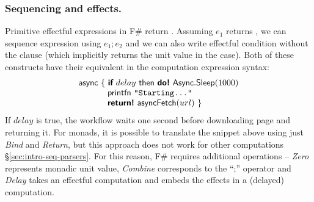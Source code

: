 \documentclass[runningheads,a4paper]{llncs}
\begin{document}
\subsubsection{Sequencing and effects.} Primitive effectful expressions in F\# return .
Assuming $e_1$ returns , we can sequence expression using $e_1; e_2$ and we can also
write effectful  condition without the  clause (which implicitly returns
the unit value in the  case). Both of these constructs have their equivalent 
in the computation expression syntax:
%
\begin{equation*}
\begin{array}{l}
\textnormal{\sffamily async}~\{~ \textnormal{\bfseries\sffamily if}~delay~\textnormal{\sffamily then}~\textnormal{\bfseries\sffamily do!}~\textnormal{\sffamily Async}.\textnormal{\sffamily Sleep}(1000)\\
\hspace{3.4em}     \textnormal{\sffamily printfn}~ \texttt{"Starting..."}\\
\hspace{3.4em}     \textnormal{\bfseries\sffamily return!}~ \textnormal{\sffamily asyncFetch}(url) ~\}
\end{array}
\end{equation*}
%
If $delay$ is true, the workflow waits one second before downloading page and returning it.
For monads, it is possible to translate the snippet above using just \emph{Bind} and \emph{Return}, 
but this approach does not work for other computations \S\ref{sec:intro-seq-parsers}. For this reason, 
F\# requires additional operations -- \emph{Zero} represents monadic unit value, \emph{Combine} 
corresponds to the ``;'' operator and \emph{Delay} takes an effectful computation and embeds the 
effects in a (delayed) computation. 
\end{document}
